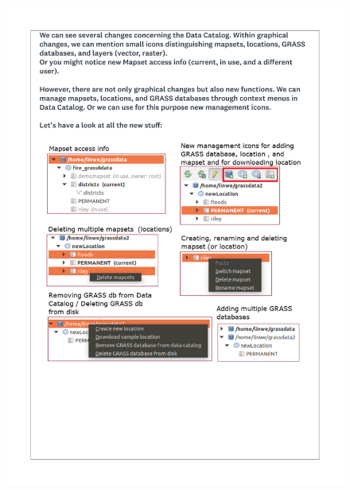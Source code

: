 \documentclass[a4paper,10pt,twoside]{article}
\begin{document}
 \newpage
 \begin{figure}[hbt!]
 \begin{center}
 \includegraphics[width=15.5cm]{../surveys/questionnaires/survey1_part1_page4_new_stuff.pdf}
 \end{center}
 \end{figure}
 
\end{document}
